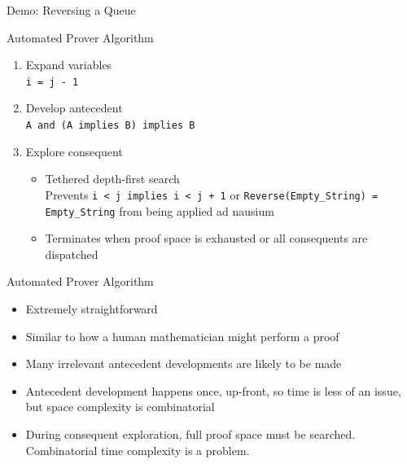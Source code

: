 \begin{frame}{Demo: Reversing a Queue}
~
\end{frame}


\begin{frame}{Automated Prover Algorithm}
	\begin{enumerate}
		\item Expand variables\\
			\texttt{i = j - 1}
		\item Develop antecedent\\
			\texttt{A and (A implies B) implies B}
		\item Explore consequent\\
		\begin{itemize}
			\item Tethered depth-first search\\
				Prevents \texttt{i < j implies i < j + 1} or \texttt{Reverse(Empty\_String) = Empty\_String} from being applied ad nausium
			\item Terminates when proof space is exhausted or all consequents are dispatched
		\end{itemize}
	\end{enumerate}
\end{frame}


\begin{frame}{Automated Prover Algorithm}
	\begin{itemize}
		\item Extremely straightforward
		\item Similar to how a human mathematician might perform a proof
		\item Many irrelevant antecedent developments are likely to be made
		\item Antecedent development happens once, up-front, so time is less of an issue, but space complexity is combinatorial
		\item During consequent exploration, full proof space must be searched.  Combinatorial time complexity is a problem.
	\end{itemize}
\end{frame}


